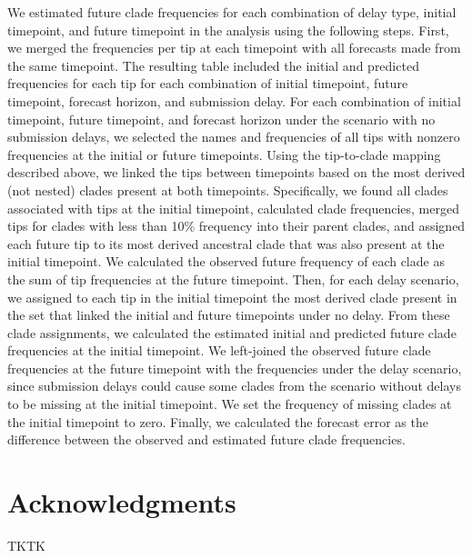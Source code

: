 \documentclass[9pt,lineno]{elife}
\begin{document}
We estimated future clade frequencies for each combination of delay type, initial timepoint, and future timepoint in the analysis using the following steps.
First, we merged the frequencies per tip at each timepoint with all forecasts made from the same timepoint.
The resulting table included the initial and predicted frequencies for each tip for each combination of initial timepoint, future timepoint, forecast horizon, and submission delay.
For each combination of initial timepoint, future timepoint, and forecast horizon under the scenario with no submission delays, we selected the names and frequencies of all tips with nonzero frequencies at the initial or future timepoints.
Using the tip-to-clade mapping described above, we linked the tips between timepoints based on the most derived (not nested) clades present at both timepoints.
Specifically, we found all clades associated with tips at the initial timepoint, calculated clade frequencies, merged tips for clades with less than 10\% frequency into their parent clades, and assigned each future tip to its most derived ancestral clade that was also present at the initial timepoint.
We calculated the observed future frequency of each clade as the sum of tip frequencies at the future timepoint.
Then, for each delay scenario, we assigned to each tip in the initial timepoint the most derived clade present in the set that linked the initial and future timepoints under no delay.
From these clade assignments, we calculated the estimated initial and predicted future clade frequencies at the initial timepoint.
We left-joined the observed future clade frequencies at the future timepoint with the frequencies under the delay scenario, since submission delays could cause some clades from the scenario without delays to be missing at the initial timepoint.
We set the frequency of missing clades at the initial timepoint to zero.
Finally, we calculated the forecast error as the difference between the observed and estimated future clade frequencies.

\section{Acknowledgments}

TKTK

\nocite{*} %

\end{document}

